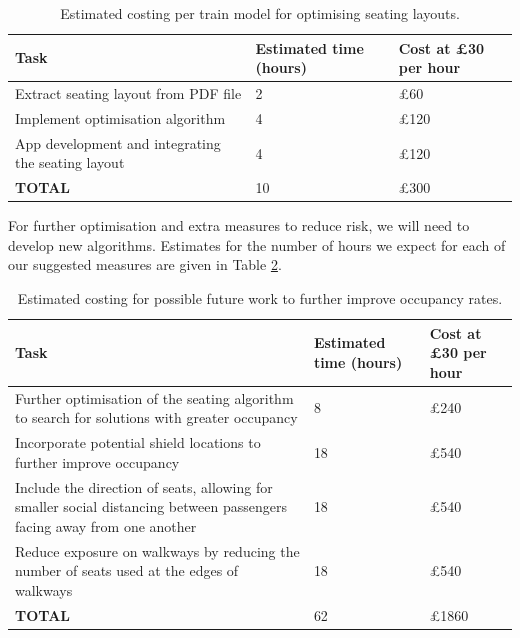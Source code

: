 \documentclass[11pt,a4paper]{article}
\begin{document}
\begin{table}[ht!]
\begin{center}
 \begin{tabularx}{\textwidth}{|X |l|l|}
 \hline
\textbf{Task} &\textbf{Estimated time (hours)} &\textbf{Cost at £30 per hour} \\
 \hline
Extract seating layout from PDF file & 2 & £60 \\
\hline
Implement optimisation algorithm  & 4 & £120 \\
\hline
App development and integrating the seating layout & 4 & £120 \\
\hline
\textbf{TOTAL}  & 10 & £300 \\
\hline
\end{tabularx}
\end{center}
\caption{Estimated costing per train model for optimising seating layouts.}
\label{tab:costing_pertrain}
\end{table}

For further optimisation and extra measures to reduce risk, we will need to develop new algorithms. Estimates for the number of hours we expect for each of our suggested measures are given in Table \ref{tab:costing_extras}.


\begin{table}[ht!]
\begin{center}
 \begin{tabularx}{\textwidth}{|X |l|l|}
 \hline
\textbf{Task} &\textbf{Estimated time (hours)} &\textbf{Cost at £30 per hour} \\
 \hline
Further optimisation of the seating algorithm to search for solutions with greater occupancy & 8 & £240 \\
\hline
Incorporate potential shield locations to further improve occupancy & 18 & £540 \\
\hline
Include the direction of seats, allowing for smaller social distancing between passengers facing away from one another & 18 & £540 \\
\hline
Reduce exposure on walkways by reducing the number of seats used at the edges of walkways  & 18 & £540 \\
\hline
\textbf{TOTAL}  & 62 & £1860 \\
\hline
\end{tabularx}
\end{center}
\caption{Estimated costing for possible future work to further improve occupancy rates.}
\label{tab:costing_extras}
\end{table}
\end{document}

